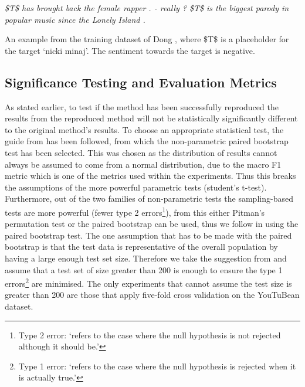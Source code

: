 \begin{example}
\textit{\$T\$ has brought back the female rapper . - really ? \$T\$ is the biggest parody in popular music since the Lonely Island .}
\caption{An example from the training dataset of Dong \citep{dong-etal-2014-adaptive}, where \$T\$ is a placeholder for the target `nicki minaj'. The sentiment towards the target is negative.}
\label{example:repro_dong_data_example}
\end{example}


\FloatBarrier
\subsection{Significance Testing and Evaluation Metrics}
As stated earlier, to test if the method has been successfully reproduced the results from the reproduced method will not be statistically significantly different to the original method's results. To choose an appropriate statistical test, the guide from \citet{dror-etal-2018-hitchhikers} has been followed, from which the non-parametric paired bootstrap test \citep{efron_1993} has been selected. This was chosen as the distribution of results cannot always be assumed to come from a normal distribution, due to the macro F1 metric \citep{dror-etal-2018-hitchhikers} which is one of the metrics used within the experiments. Thus this breaks the assumptions of the more powerful parametric tests (student's t-test). Furthermore, out of the two families of non-parametric tests the sampling-based tests are more powerful \citep{dror-etal-2018-hitchhikers, sogaard-etal-2014-whats} (fewer type 2 errors\footnote{Type 2 error: `refers to the case where the null hypothesis is not rejected although it should be.'\citep{dror-etal-2018-hitchhikers}}), from this either Pitman's permutation test or the paired bootstrap can be used, thus we follow \citet{sogaard-etal-2014-whats} in using the paired bootstrap test. The one assumption that has to be made with the paired bootstrap is that the test data is representative of the overall population by having a large enough test set size. Therefore we take the suggestion from \citet{sogaard-etal-2014-whats} and assume that a test set of size greater than 200 is enough to ensure the type 1 errors\footnote{Type 1 error: `refers to the case where the null hypothesis is rejected when it is actually true.'\citep{dror-etal-2018-hitchhikers}} are minimised. The only experiments that cannot assume the test size is greater than 200 are those that apply five-fold cross validation on the YouTuBean dataset.


